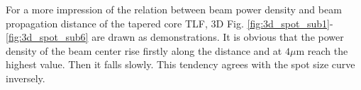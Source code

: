 For a more impression of the relation between beam power density and beam propagation distance of the tapered core TLF, 3D Fig. \ref{fig:3d_spot_sub1}-\ref{fig:3d_spot_sub6} are drawn as demonstrations. It is obvious that the power density of the beam center rise firstly along the distance and at $4\mu$m reach the highest value. Then it falls slowly. This tendency agrees with the spot size curve inversely. 
\begin{figure}[!ht]
\setlength{\abovecaptionskip}{0pt}%
\flushleft
\end{figure}

